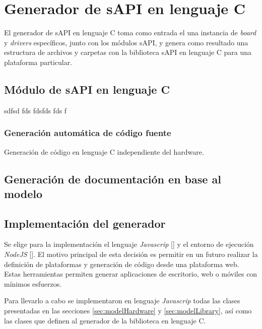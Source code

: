 \section{Generador de sAPI en lenguaje C}
\label{sec:modelGenerator}

El generador de sAPI en lenguaje C toma como entrada el una instancia de \emph{board} y \emph{drivers} específicos, junto con los módulos sAPI, y genera como resultado una estructura de archivos y carpetas con la biblioteca sAPI en lenguaje C para una plataforma particular.
 


\subsection{Módulo de sAPI en lenguaje C}

sdfsd fds fdsfds fds f

\subsubsection{Generación automática de código fuente}


Generación de código en lenguaje C independiente del hardware.


\subsection{Generación de documentación en base al modelo}



\subsection{Implementación del generador}

Se elige para la implementación el lenguaje \emph{Javascrip} [] y el entorno de ejecución \emph{NodeJS} []. El motivo principal de esta decisión es permitir en un futuro realizar la definición de plataformas y generación de código desde una plataforma web. Estas herramientas permiten generar aplicaciones de escritorio, web o móviles con mínimos esfuerzos.

Para llevarlo a cabo se implementaron en lenguaje \emph{Javascrip} todas las clases presentadas en las secciones \ref{sec:modelHardware} y \ref{sec:modelLibrary}, así como las clases que definen al generador de la biblioteca en lenguaje C.
